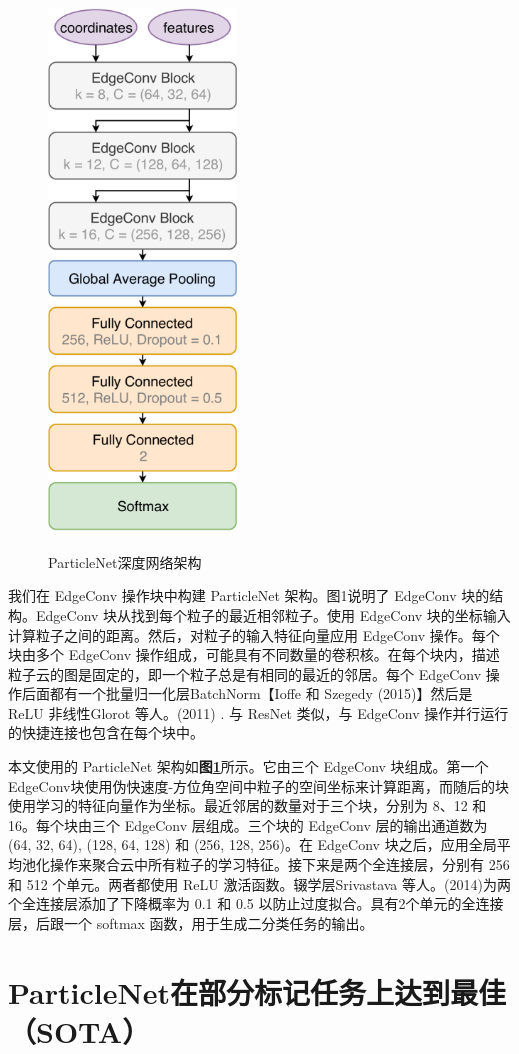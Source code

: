 \begin{figure}[H]
 \centering
 \caption{ParticleNet深度网络架构}
 \includegraphics[height=14cm, width=5cm]{pictures/ParticleNet_Architecture.png}
 \label{fig:4.2}
\end{figure}

我们在 EdgeConv 操作块中构建 ParticleNet 架构。图1说明了 EdgeConv 块的结构。EdgeConv 块从找到每个粒子的最近相邻粒子。使用 EdgeConv 块的坐标输入计算粒子之间的距离。然后，对粒子的输入特征向量应用 EdgeConv 操作。每个块由多个 EdgeConv 操作组成，可能具有不同数量的卷积核。在每个块内，描述粒子云的图是固定的，即一个粒子总是有相同的最近的邻居。每个 EdgeConv 操作后面都有一个批量归一化层BatchNorm【Ioffe 和 Szegedy (2015)】然后是 ReLU 非线性Glorot 等人。(2011) . 与 ResNet 类似，与 EdgeConv 操作并行运行的快捷连接也包含在每个块中。


本文使用的 ParticleNet 架构如\textbf{图\ref{fig:4.2}}所示。它由三个 EdgeConv 块组成。第一个EdgeConv块使用伪快速度-方位角空间中粒子的空间坐标来计算距离，而随后的块使用学习的特征向量作为坐标。最近邻居的数量对于三个块，分别为 8、12 和 16。每个块由三个 EdgeConv 层组成。三个块的 EdgeConv 层的输出通道数为 (64, 32, 64), (128, 64, 128) 和 (256, 128, 256)。在 EdgeConv 块之后，应用全局平均池化操作来聚合云中所有粒子的学习特征。接下来是两个全连接层，分别有 256 和 512 个单元。两者都使用 ReLU 激活函数。辍学层Srivastava 等人。(2014)为两个全连接层添加了下降概率为 0.1 和 0.5 以防止过度拟合。具有2个单元的全连接层，后跟一个 softmax 函数，用于生成二分类任务的输出。

\section{ParticleNet在部分标记任务上达到最佳（SOTA）}